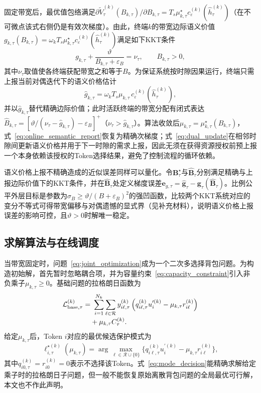 \documentclass[journal]{IEEEtran}
\begin{document}
固定带宽后，最优值包络满足$\partial\widetilde V_{\tau}^{(k)}(B_{k,\tau})/\partial B_{k,\tau}=T_s\mu_{k,\tau}^{\star}c_{\varepsilon}^{(k)}(\widehat h_{\tau}^{(k)})$（在不可微点该式右侧仍是有效次梯度）。由此，终端$k$的带宽边际语义价值$g_{k,\tau}(B_{k,\tau})=\omega_kT_s\mu_{k,\tau}^{\star}c_{\varepsilon}^{(k)}(\widehat h_{\tau}^{(k)})$满足如下KKT条件
\begin{equation}
g_{k,\tau}+
\frac{\vartheta}{B_{k,\tau}+\varepsilon_B}
=\nu_{\tau},
\qquad B_{k,\tau}>0,
\label{eq:bandwidth_kkt}
\end{equation}
其中$\nu_{\tau}$取值使各终端获配带宽之和等于$B$。为保证系统按时隙因果运行，终端只需上报当前对偶迭代下的语义价格估计
\begin{equation}
\widehat g_{k,\tau}
=\omega_kT_s\mu_{k,\tau}
\,c_{\varepsilon}^{(k)}(\widehat h_{\tau}^{(k)}),
\label{eq:online_semantic_report}
\end{equation}
并以$\widehat g_{k,\tau}$替代精确边际价值；此时活跃终端的带宽分配有闭式表达$\widehat B_{k,\tau}=[\vartheta/(\nu_{\tau}-\widehat g_{k,\tau})-\varepsilon_B]^+$（$\nu_{\tau}>\widehat g_{k,\tau}$）。算法收敛后$\mu_{k,\tau}=\mu_{k,\tau}^{\star}(B_{k,\tau})$，式~\eqref{eq:online_semantic_report}恢复为精确次梯度；式~\eqref{eq:dual_update}在相邻时隙间更新语义价格并用于下一时隙的需求上报，因此无须在获得资源授权前预上报一个本身依赖该授权的Token选择结果，避免了控制流程的循环依赖。

语义价格上报不精确造成的近似误差同样可以量化。令$\bm B_{\tau}^{\star}$与$\widehat{\bm B}_{\tau}$分别满足精确与上报边际价值下的KKT条件，并在$\widehat{\bm B}_{\tau}$处定义梯度误差$\bm e_{g,\tau}=\widehat{\bm g}_{\tau}-\bm g_{\tau}(\widehat{\bm B}_{\tau})$。比例公平外层目标是参数为$\sigma_B\ge\vartheta/(B+\varepsilon_B)^2$的强凹函数，比较两个KKT系统对应的变分不等式可得带宽偏移与对偶遗憾的显式界（见补充材料），说明语义价格上报误差的影响可控，且$\vartheta>0$时解唯一稳定。
\subsection{求解算法与在线调度}

当带宽固定时，问题~\eqref{eq:joint_optimization}成为一个二次多选择背包问题。为构造初始解，首先暂时忽略耦合项，并为容量约束~\eqref{eq:capacity_constraint}引入非负乘子$\mu_{k,\tau}\geq0$。基础问题的拉格朗日函数为
\begin{align}
\mathcal L_{\mathrm{base},\tau}^{(k)}
=&~\sum_{i=1}^{N_k}\sum_{\ell\in\mathcal R}
y_{i\ell,\tau}^{(k)}
\left(q_{i\ell,\tau}^{(k)}u_i^{\prime(k)}
-\mu_{k,\tau}r_{i\ell}^{(k)}\right)
\notag\\[-0.2em]
&+\mu_{k,\tau}C_{\tau}^{(k)}.
\label{eq:base_lagrangian}
\end{align}
给定$\mu_{k,\tau}$后，Token $i$对应的最优候选保护模式为
\begin{equation}
\ell_{i,\tau}^{\star(k)}(\mu_{k,\tau})
=\arg\max_{\ell\in\mathcal R\cup\{0\}}
\{q_{i\ell,\tau}^{(k)}u_i^{\prime(k)}
-\mu_{k,\tau}r_{i\ell}^{(k)}\},
\label{eq:mode_decision}
\end{equation}
其中$q_{i0,\tau}^{(k)}=r_{i0}^{(k)}=0$表示不选择该Token。式~\eqref{eq:mode_decision}能精确求解给定乘子时的拉格朗日子问题，但一般不能恢复原始离散背包问题的全局最优可行解，本文也不作此声明。
\end{document}
